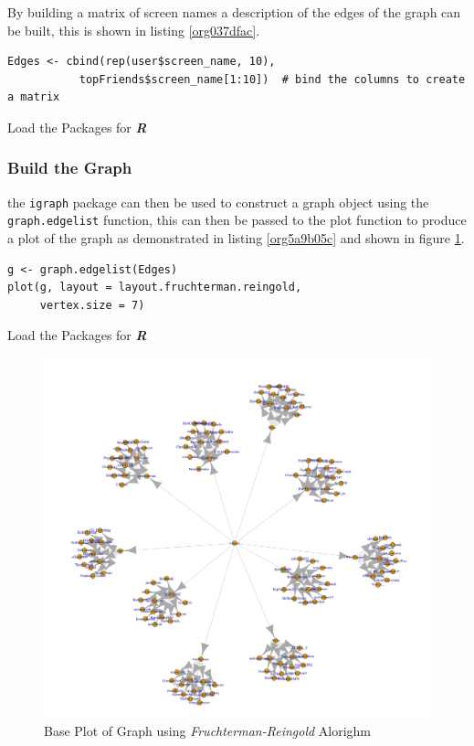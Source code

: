 \documentclass[11pt]{article}
\begin{document}
By building a matrix of screen names a description of the edges of the graph can be built, this is shown in listing \ref{org037dfac}.

\begin{listing}[htbp]
\begin{verbatim}
Edges <- cbind(rep(user$screen_name, 10),
           topFriends$screen_name[1:10])  # bind the columns to create a matrix

\end{verbatim}
\caption{\label{org037dfac}Load the Packages for \textbf{\textbf{\emph{R}}}}
\end{listing}

\subsubsection{Build the Graph}
\label{sec:org2cb3f3c}
the \texttt{igraph} package can then be used to construct a graph object using the \texttt{graph.edgelist} function, this can then be passed to the plot function to produce a plot of the graph as demonstrated in listing \ref{org5a9b05c} and shown in figure \ref{fig:orgf808771}.

\begin{listing}[htbp]
\begin{verbatim}
g <- graph.edgelist(Edges)
plot(g, layout = layout.fruchterman.reingold,
     vertex.size = 7)
\end{verbatim}
\caption{\label{org5a9b05c}Load the Packages for \textbf{\textbf{\emph{R}}}}
\end{listing}


\begin{figure}[htbp]
\centering
\includegraphics[width=12cm]{./Figures/Graph_Base_1.png}
\caption{\label{fig:orgf808771}Base Plot of Graph using \emph{Fruchterman-Reingold} Alorighm}
\end{figure}
\end{document}
